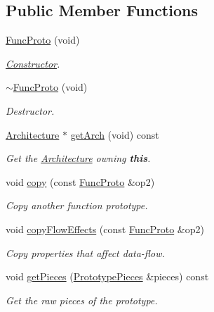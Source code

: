 \subsection*{Public Member Functions}
\begin{DoxyCompactItemize}
\item 
\mbox{\hyperlink{class_func_proto_a9c7db7dec63a18a9de97b0ba9f6f42bd}{Func\+Proto}} (void)
\begin{DoxyCompactList}\small\item\em \mbox{\hyperlink{class_constructor}{Constructor}}. \end{DoxyCompactList}\item 
\mbox{\hyperlink{class_func_proto_a142706f5f3c9086635f812501521f3b4}{$\sim$\+Func\+Proto}} (void)
\begin{DoxyCompactList}\small\item\em Destructor. \end{DoxyCompactList}\item 
\mbox{\hyperlink{class_architecture}{Architecture}} $\ast$ \mbox{\hyperlink{class_func_proto_ac21659d866e78bb27aca67f1cb2df390}{get\+Arch}} (void) const
\begin{DoxyCompactList}\small\item\em Get the \mbox{\hyperlink{class_architecture}{Architecture}} owning {\bfseries{this}}. \end{DoxyCompactList}\item 
void \mbox{\hyperlink{class_func_proto_a9bd4f3bc764b11b57f4e71b9d19df27d}{copy}} (const \mbox{\hyperlink{class_func_proto}{Func\+Proto}} \&op2)
\begin{DoxyCompactList}\small\item\em Copy another function prototype. \end{DoxyCompactList}\item 
void \mbox{\hyperlink{class_func_proto_ace26c345cdf567de704b24cd99e8a254}{copy\+Flow\+Effects}} (const \mbox{\hyperlink{class_func_proto}{Func\+Proto}} \&op2)
\begin{DoxyCompactList}\small\item\em Copy properties that affect data-\/flow. \end{DoxyCompactList}\item 
void \mbox{\hyperlink{class_func_proto_a1b220dc769358d73110df5c60744566b}{get\+Pieces}} (\mbox{\hyperlink{struct_prototype_pieces}{Prototype\+Pieces}} \&pieces) const
\begin{DoxyCompactList}\small\item\em Get the raw pieces of the prototype. \end{DoxyCompactList}\item 

\end{DoxyCompactItemize}
